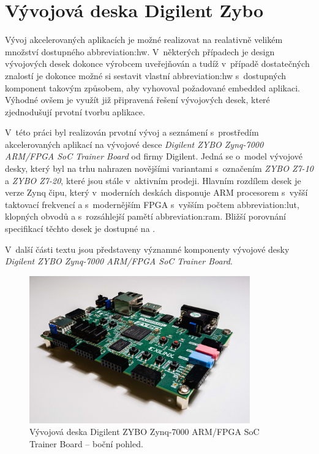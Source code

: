 \documentclass[a4paper, twoside, 11pt]{article}
\begin{document}
	

	\section{Vývojová deska Digilent Zybo}\label{sec:vyvojova-deska-digilent-zybo}
			Vývoj akcelerovaných aplikacích je možné realizovat na realativně velikém množství dostupného \gls{abbreviation:hw}. V~některých případech je design vývojových desek dokonce výrobcem uveřejňován a tudíž v~případě dostatečných znalostí je dokonce možné si sestavit vlastní \gls{abbreviation:hw} s~dostupných komponent takovým způsobem, aby vyhovoval požadované embedded aplikaci. Výhodné ovšem je využít již připravená řešení vývojových desek, které zjednodušují prvotní tvorbu aplikace.\par
			V~této práci byl realizován prvotní vývoj a seznámení s~prostředím akcelerovaných aplikací na vývojové desce \textit{Digilent ZYBO Zynq-7000 ARM/FPGA SoC Trainer Board} od firmy Digilent. \cite{digilent-zybo-7000-docs} Jedná se o~model vývojové desky, který byl na trhu nahrazen novějšími variantami s~označením \textit{ZYBO Z7-10} a \textit{ZYBO Z7-20}, které jsou stále v~aktivním prodeji. Hlavním rozdílem desek je verze Zynq čipu, který v~moderních deskách disponuje ARM procesorem s~vyšší taktovací frekvencí a s~modernějším FPGA s~vyšším počtem \gls{abbreviation:lut}, klopných obvodů a s~rozsáhlejší pamětí \gls{abbreviation:ram}. Bližší porovnání specifikací těchto desek je dostupné na \cite{digilent-zybo-compare}.\par
			V~další části textu jsou představeny významné komponenty vývojové desky \textit{Digilent ZYBO Zynq-7000 ARM/FPGA SoC Trainer Board}.

			\begin{figure}[htbp!]
				\centering
					\includegraphics[width=0.85\textwidth]{src/jpg/digilent-zybo-foto-2.jpeg} 
					\caption{Vývojová deska Digilent ZYBO Zynq-7000 ARM/FPGA SoC Trainer Board – boční pohled.}
					\label{fig:digilent-zybo-foto-2}
			\end{figure}
\end{document}
